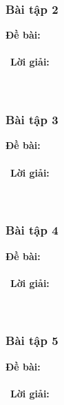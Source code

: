\documentclass[a4paper]{article}
\begin{document}
\subsubsection{Bài tập 2}
\textbf{Đề bài:} 
\\\ \\\
\textbf{Lời giải:} \\\ \\\
\clearpage
\subsubsection{Bài tập 3}
\textbf{Đề bài:} 
\\\ \\\
\textbf{Lời giải:} \\\ \\\
\clearpage
\subsubsection{Bài tập 4}
\textbf{Đề bài:} 
\\\ \\\
\textbf{Lời giải:} \\\ \\\
\clearpage
\subsubsection{Bài tập 5}
\textbf{Đề bài:} 
\\\ \\\
\textbf{Lời giải:} \\\ \\\
\clearpage

\clearpage
\end{document}
